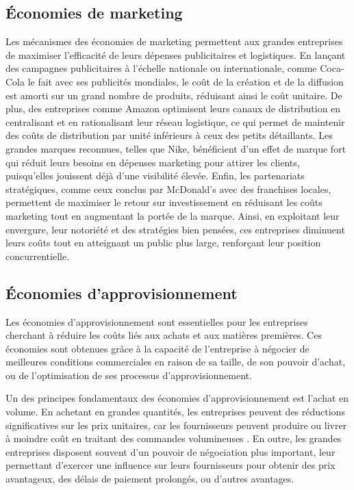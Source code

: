 \subsection {Économies de marketing}
Les mécanismes des économies de marketing permettent aux grandes entreprises de
maximiser l'efficacité de leurs dépenses publicitaires et logistiques. En
lançant des campagnes publicitaires à l'échelle nationale ou internationale,
comme Coca-Cola le fait avec ses publicités mondiales, le coût de la création
et de la diffusion est amorti sur un grand nombre de produits, réduisant ainsi
le coût unitaire. De plus, des entreprises comme Amazon optimisent leurs canaux
de distribution en centralisant et en rationalisant leur réseau logistique, ce
qui permet de maintenir des coûts de distribution par unité inférieurs à ceux
des petits détaillants. Les grandes marques reconnues, telles que Nike,
bénéficient d'un effet de marque fort qui réduit leurs besoins en dépenses
marketing pour attirer les clients, puisqu'elles jouissent déjà d'une
visibilité élevée. Enfin, les partenariats stratégiques, comme ceux conclus par
McDonald's avec des franchises locales, permettent de maximiser le retour sur
investissement en réduisant les coûts marketing tout en augmentant la portée de
la marque. Ainsi, en exploitant leur envergure, leur notoriété et des
stratégies bien pensées, ces entreprises diminuent leurs coûts tout en
atteignant un public plus large, renforçant leur position concurrentielle.
\subsection{Économies d’approvisionnement}
Les économies d'approvisionnement sont essentielles pour les entreprises
cherchant à réduire les coûts liés aux achats et aux matières premières. Ces
économies sont obtenues grâce à la capacité de l'entreprise à négocier de
meilleures conditions commerciales en raison de sa taille, de son pouvoir
d'achat, ou de l'optimisation de ses processus d'approvisionnement.
\par
Un des principes fondamentaux des économies d'approvisionnement est l'achat en
volume. En achetant en grandes quantités, les entreprises peuvent des
réductions significatives sur les prix unitaires, car les fournisseurs peuvent
produire ou livrer à moindre coût en traitant des commandes volumineuses . En
outre, les grandes entreprises disposent souvent d'un pouvoir de négociation
plus important, leur permettant d'exercer une influence sur leurs fournisseurs
pour obtenir des prix avantageux, des délais de paiement prolongés, ou d'autres
avantages.
